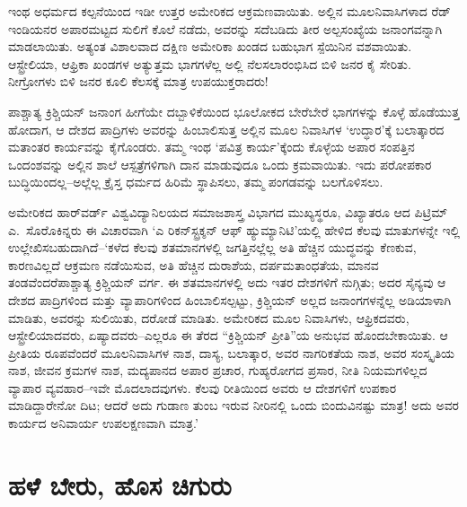 ಇಂಥ ಅಧರ್ಮದ ಕಲ್ಪನೆಯಿಂದ ಇಡೀ ಉತ್ತರ ಅಮೇರಿಕದ ಆಕ್ರಮಣವಾಯಿತು. ಅಲ್ಲಿನ ಮೂಲನಿವಾಸಿಗಳಾದ ರೆಡ್ ಇಂಡಿಯನರ ಅಪಾರಮಟ್ಟದ ಸುಲಿಗೆ ಕೊಲೆ ನಡೆದು, ಅವರನ್ನು ಸದೆಬಡಿದು ತೀರ ಅಲ್ಪಸಂಖ್ಯೆಯ ಜನಾಂಗವನ್ನಾಗಿ ಮಾಡಲಾಯಿತು. ಅತ್ಯಂತ ವಿಶಾಲವಾದ ದಕ್ಷಿಣ ಅಮೇರಿಕಾ ಖಂಡದ ಬಹುಭಾಗ ಸ್ಪೆಯಿನಿನ ವಶವಾಯಿತು. ಆಸ್ಟ್ರೇಲಿಯಾ, ಆಫ್ರಿಕಾ ಖಂಡಗಳ ಅತ್ಯುತ್ತಮ ಭಾಗಗಳೆಲ್ಲ ಅಲ್ಲಿ ನೆಲಸಲಾರಂಭಿಸಿದ ಬಿಳಿ ಜನರ ಕೈ ಸೇರಿತು. ನೀಗ್ರೋಗಳು ಬಿಳಿ ಜನರ ಕೂಲಿ ಕೆಲಸಕ್ಕೆ ಮಾತ್ರ ಉಪಯುಕ್ತರಾದರು!

ಪಾಶ್ಚಾತ್ಯ ಕ್ರಿಶ್ಚಿಯನ್​ ಜನಾಂಗ ಹೀಗೆಯೇ ದಬ್ಬಾಳಿಕೆಯಿಂದ ಭೂಲೋಕದ ಬೇರೆಬೇರೆ ಭಾಗಗಳನ್ನು ಕೊಳ್ಳೆ ಹೊಡೆಯುತ್ತ ಹೋದಾಗ, ಆ ದೇಶದ ಪಾದ್ರಿಗಳು ಅವರನ್ನು ಹಿಂಬಾಲಿಸುತ್ತ ಅಲ್ಲಿನ ಮೂಲ ನಿವಾಸಿಗಳ ‘ಉದ್ಧಾರ’ಕ್ಕೆ ಬಲಾತ್ಕಾರದ ಮತಾಂತರ ಕಾರ್ಯವನ್ನು ಕೈಗೊಂಡರು. ತಮ್ಮ ಇಂಥ ‘ಪವಿತ್ರ ಕಾರ್ಯ’ಕ್ಕೆಂದು ಕೊಳ್ಳೆಯ ಅಪಾರ ಸಂಪತ್ತಿನ ಒಂದಂಶವನ್ನು ಅಲ್ಲಿನ ಶಾಲೆ ಆಸ್ಪತ್ರೆಗಳಿಗಾಗಿ ದಾನ ಮಾಡುವುದೂ ಒಂದು ಕ್ರಮವಾಯಿತು. ಇದು ಪರೋಪಕಾರ ಬುದ್ಧಿಯಿಂದಲ್ಲ–ಅಲ್ಲೆಲ್ಲ ಕ್ರೈಸ್ತ ಧರ್ಮದ ಹಿರಿಮೆ ಸ್ಥಾಪಿಸಲು, ತಮ್ಮ ಪಂಗಡವನ್ನು ಬಲಗೊಳಿಸಲು.

ಅಮೇರಿಕದ ಹಾರ್​ವರ್ಡ್ ವಿಶ್ವವಿದ್ಯಾನಿಲಯದ ಸಮಾಜಶಾಸ್ತ್ರ ವಿಭಾಗದ ಮುಖ್ಯಸ್ಥರೂ, ವಿಖ್ಯಾತರೂ ಆದ ಪಿಟ್ರಿಮ್ ಎ.\ ಸೊರೊಕಿನ್ನರು ಈ ವಿಚಾರವಾಗಿ ‘ಎ ರಿಕನ್​ಸ್ಟ್ರಕ್ಶನ್ ಆಫ್ ಹ್ಯುಮ್ಯಾನಿಟಿ’ಯಲ್ಲಿ ಹೇಳಿದ ಕೆಲವು ಮಾತುಗಳನ್ನೇ ಇಲ್ಲಿ ಉಲ್ಲೇಖಿಸಬಹುದಾಗಿದೆ–‘ಕಳೆದ ಕೆಲವು ಶತಮಾನಗಳಲ್ಲಿ ಜಗತ್ತಿನಲ್ಲೆಲ್ಲ ಅತಿ ಹೆಚ್ಚಿನ ಯುದ್ಧವನ್ನು ಕೆಣಕುವ, ಕಾರಣವಿಲ್ಲದೆ ಆಕ್ರಮಣ ನಡೆಯಿಸುವ, ಅತಿ ಹೆಚ್ಚಿನ ದುರಾಶೆಯ, ದರ್ಪಮತಾಂಧತೆಯ, ಮಾನವ \hbox\bgroup ತಂಡವೆಂದರೆ\egroup\break ಪಾಶ್ಚಾತ್ಯ ಕ್ರಿಶ್ಚಿಯನ್​ ವರ್ಗ. ಈ ಶತಮಾನಗಳಲ್ಲಿ ಅದು ಇತರ ದೇಶಗಳಿಗೆ ನುಗ್ಗಿತು; ಅದರ ಸೈನ್ಯವು ಆ ದೇಶದ ಪಾದ್ರಿಗಳಿಂದ ಮತ್ತು ವ್ಯಾಪಾರಿಗಳಿಂದ ಹಿಂಬಾಲಿಸಲ್ಪಟ್ಟು, ಕ್ರಿಶ್ಚಿಯನ್ ಅಲ್ಲದ ಜನಾಂಗಗಳನ್ನೆಲ್ಲ ಅಡಿಯಾಳಾಗಿ ಮಾಡಿತು, ಅವರನ್ನು ಸುಲಿಯಿತು, ದರೋಡೆ ಮಾಡಿತು. ಅಮೇರಿಕದ ಮೂಲ ನಿವಾಸಿಗಳು, ಆಫ್ರಿಕದವರು, ಆಸ್ಟ್ರೇಲಿಯಾದವರು, ಏಷ್ಯಾದವರು–ಎಲ್ಲರೂ ಈ ತೆರದ “ಕ್ರಿಶ್ಚಿಯನ್ ಪ್ರೀತಿ”ಯ ಅನುಭವ ಹೊಂದಬೇಕಾಯಿತು. ಆ ಪ್ರೀತಿಯ ರೂಪವೆಂದರೆ ಮೂಲನಿವಾಸಿಗಳ ನಾಶ, ದಾಸ್ಯ, ಬಲಾತ್ಕಾರ, ಅವರ ನಾಗರಿಕತೆಯ ನಾಶ, ಅವರ ಸಂಸ್ಕೃತಿಯ ನಾಶ, ಜೀವನ ಕ್ರಮಗಳ ನಾಶ, ಮದ್ಯಪಾನದ ಅಪಾರ ಪ್ರಚಾರ, ಗುಹ್ಯರೋಗದ ಪ್ರಸಾರ, ನೀತಿ ನಿಯಮಗಳಿಲ್ಲದ ವ್ಯಾಪಾರ ವ್ಯವಹಾರ–ಇವೇ ಮೊದಲಾದವುಗಳು. ಕೆಲವು ರೀತಿಯಿಂದ ಅವರು ಆ ದೇಶಗಳಿಗೆ ಉಪಕಾರ ಮಾಡಿದ್ದಾರೇನೋ ದಿಟ; ಆದರೆ ಅದು ಗುಡಾಣ ತುಂಬ ಇರುವ ನೀರಿನಲ್ಲಿ ಒಂದು ಬಿಂದುವಿನಷ್ಟು ಮಾತ್ರ! ಅದು ಅವರ ಕಾರ್ಯದ ಅನಿವಾರ್ಯ ಉಪಲಕ್ಷಣವಾಗಿ ಮಾತ್ರ.’


\section*{ಹಳೆ ಬೇರು, ಹೊಸ ಚಿಗುರು}



